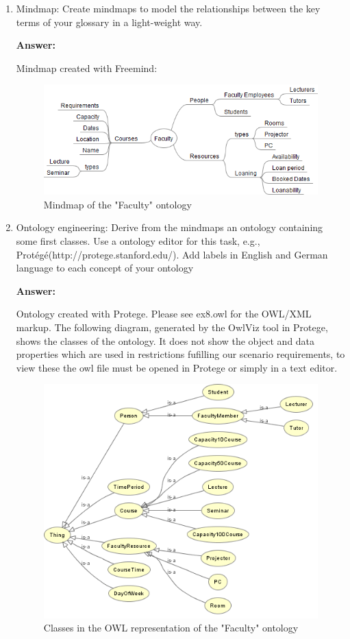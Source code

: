\documentclass[10pt,a4paper]{article}
\begin{document}
\begin{enumerate}
\begin{enumerate}
\item Mindmap: Create mindmaps to model the relationships between the key terms of your glossary in a light-weight way.

\textbf{Answer:}

Mindmap created with Freemind:

\begin{figure}[H]
  \caption{Mindmap of the "Faculty" ontology}
  \centering
    \includegraphics[scale=0.7]{Faculty_mindmap.png}
\end{figure}

\item Ontology engineering: Derive from the mindmaps an ontology containing some first classes. Use a ontology editor for this task, e.g., Protégé(http://protege.stanford.edu/). Add labels in English and German language to each concept of your ontology

\textbf{Answer:}

Ontology created with Protege. Please see ex8.owl for the OWL/XML markup. The following diagram, generated by the OwlViz tool in Protege, shows the classes of the ontology. It does not show the object and data properties which are used in restrictions fufilling our scenario requirements, to view these the owl file must be opened in Protege or simply in a text editor.

\begin{figure}[H]
  \caption{Classes in the OWL representation of the "Faculty" ontology}
  \centering
    \includegraphics[scale=0.7]{owl_graph.png}
\end{figure}


\end{enumerate}
\end{enumerate}
\end{document}

